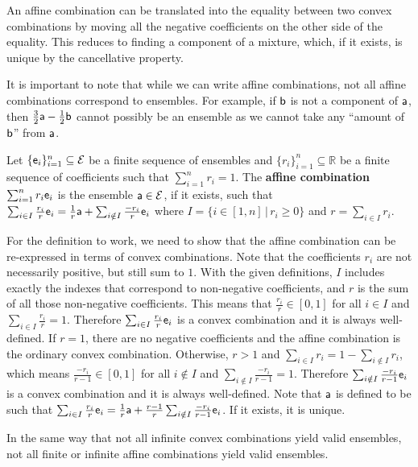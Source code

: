 An affine combination can be translated into the equality between two convex combinations by moving all the negative coefficients on the other side of the equality. This reduces to finding a component of a mixture, which, if it exists, is unique by the cancellative property.

It is important to note that while we can write affine combinations, not all affine combinations correspond to ensembles. For example, if $\ens[b]$ is not a component of $\ens[a]$, then $\frac{3}{2}\ens[a] - \frac{1}{2} \ens[b]$ cannot possibly be an ensemble as we cannot take any ``amount of $\ens[b]$'' from $\ens[a]$.

\begin{mathSection}	
\begin{defn}
	Let $\{\ens_i\}_{i=1}^n \subseteq \Ens$ be a finite sequence of ensembles and $\{r_i\}_{i=1}^n \subseteq \mathbb{R}$ be a finite sequence of coefficients such that $\sum_{i=1}^n r_i = 1$. The \textbf{affine combination} $\sum_{i=1}^n r_i \ens_i$ is the ensemble $\ens[a] \in \Ens$, if it exists, such that  $\sum_{i \in I} \frac{r_i}{r} \ens_i = \frac{1}{r} \ens[a] + \sum_{i \notin I} \frac{-r_i}{r} \ens_i$ where $I = \{ i \in [1,n] \, | \, r_i \geq 0 \}$ and $r = \sum_{i \in I} r_i$.
\end{defn}

\begin{check}
	For the definition to work, we need to show that the affine combination can be re-expressed in terms of convex combinations. Note that the coefficients $r_i$ are not necessarily positive, but still sum to $1$. With the given definitions, $I$ includes exactly the indexes that correspond to non-negative coefficients, and $r$ is the sum of all those non-negative coefficients. This means that $\frac{r_i}{r} \in [0,1]$ for all $i \in I$ and $\sum_{i \in I} \frac{r_i}{r}=1$. Therefore $\sum_{i \in I} \frac{r_i}{r} \ens_i$ is a convex combination and it is always well-defined. If $r=1$, there are no negative coefficients and the affine combination is the ordinary convex combination. Otherwise, $r>1$ and $\sum_{i \in I} r_i = 1 - \sum_{i \notin I} r_i$, which means $\frac{-r_i}{r - 1} \in [0,1]$ for all $i \notin I$ and $\sum_{i \notin I} \frac{-r_i}{r-1}=1$. Therefore $\sum_{i \notin I} \frac{-r_i}{r-1} \ens_i$ is a convex combination and it is always well-defined. Note that $\ens[a]$ is defined to be such that $\sum_{i \in I} \frac{r_i}{r} \ens_i = \frac{1}{r} \ens[a] + \frac{r-1}{r}\sum_{i \notin I} \frac{-r_i}{r-1} \ens_i$. If it exists, it is unique.
\end{check}	

\begin{remark}
	In the same way that not all infinite convex combinations yield valid ensembles, not all finite or infinite affine combinations yield valid ensembles.
\end{remark}
\end{mathSection}

